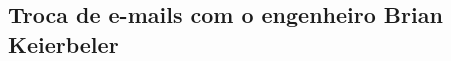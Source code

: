 \documentclass[
	12pt,				%
	openright,			%
	oneside,			%
	a4paper,			%
	chapter=TITLE,		%
	english,			%
	french,				%
	spanish,			%
	brazil				%
	]{abntex2}
\begin{document}
\begin{anexosenv}
%
\partanexos
\chapter{Troca de e-mails com o engenheiro Brian Keierbeler}




%
%
%
%
\end{anexosenv}

\printindex
\end{document}
